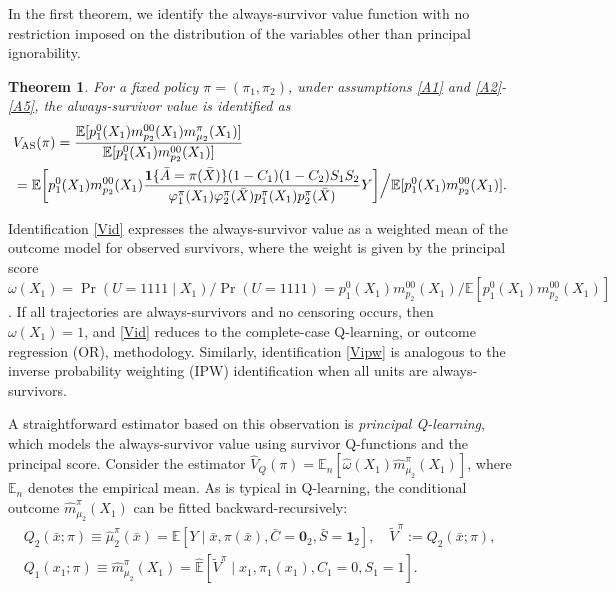 \documentclass{article}
\newcommand{\wh}{\widehat}
\newcommand{\pk}{{\varphi}}
\newcommand{\E}{\mathbb{E}}
\newcommand{\tred}{{}}   %
\newtheorem{theorem}{Theorem}
\begin{document}
In the first theorem, we identify the always-survivor value function with no restriction imposed on the distribution of the variables other than principal ignorability.
	\begin{theorem} \label{thm:1}
		For a fixed policy $\pi = (\pi_1, \pi_2)$, under assumptions \ref{A1} and \ref{A2}-\ref{A5}, the always-survivor value is identified as
	\begin{align}
		&V_\textnormal{AS}(\pi) =  
			\frac{\E[p_1^0(X_1) m_{p_2}^{00}(X_1) m_{\mu_2}^{\pi}(X_1) ]}
			{ \E[p_1^0(X_1) m_{p_2}^{00}(X_1)] }  \label{Vid} \\
		&= \tred{
		  \E\bigg[ p_1^0(X_1) m_{p_2}^{00}(X_1) \frac{\mathbf{1}\{\bar A=\pi(\bar X)\}(1-C_1)(1-C_2)S_1S_2}{\pk_1^\pi(X_1)\pk_2^\pi(\bar X)p_1^\pi(X_1)p_2^\pi(\bar X)} Y \bigg]  
		  \Big/  \E[ p_1^0(X_1) m_{p_2}^{00}(X_1) ]. 
		  }  \label{Vipw}
	\end{align}
	\end{theorem}
	
Identification \eqref{Vid} expresses the always-survivor value as a weighted mean of the outcome model for observed survivors, where the weight is given by the principal score
$\omega(X_1) = {\Pr(U = 1111 \mid X_1)}/{\Pr(U = 1111)} = {p_1^0(X_1) m_{p_2}^{00}(X_1)}/{\mathbb{E}[p_1^0(X_1) m_{p_2}^{00}(X_1)]}$. If all trajectories are always-survivors and no censoring occurs, then $\omega(X_1) = 1$, and \eqref{Vid} reduces to the complete-case Q-learning, or outcome regression (OR), methodology. 
\tred{Similarly, identification \eqref{Vipw} is analogous to the inverse probability weighting (IPW) identification when all units are always-survivors.}

A straightforward estimator based on this observation is \textit{principal Q-learning}, which models the always-survivor value using survivor Q-functions and the principal score. 
Consider the estimator $\wh{V}_{Q}(\pi) = \mathbb{E}_n[\wh{\omega}(X_1) \wh{m}_{\mu_2}^\pi(X_1)]$, where $\mathbb{E}_n$ denotes the empirical mean. As is typical in Q-learning, the conditional outcome $\wh{m}_{\mu_2}^{\pi}(X_1)$ can be fitted backward-recursively: 
\begin{gather*}
	Q_2(\bar{x}; \pi) \equiv \hat{\mu}_2^\pi(\bar{x}) = \hat{\mathbb{E}} \left[ Y \mid \bar{x}, \pi(\bar{x}), \bar{C} = \mathbf{0}_2, \bar{S} = \mathbf{1}_2 \right], \quad \tilde{V}^\pi := Q_2(\bar{x}; \pi), \\
	Q_1(x_1; \pi) \equiv \wh{m}_{\mu_2}^\pi(X_1) = \wh{\mathbb{E}} \left[ \tilde{V}^\pi \mid x_1, \pi_1(x_1), C_1 = 0, S_1 = 1 \right].
\end{gather*}
\end{document}

